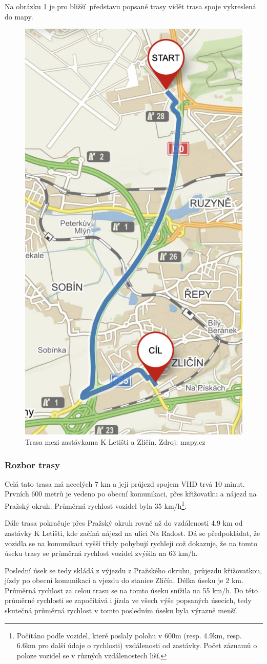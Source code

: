 \bigbreak

Na obrázku \ref{fig:k_letisti_to_zlicin_map} je pro bližší představu popsané trasy vidět trasa spoje vykreslená do mapy.

\begin{figure}
	\centering
  \includegraphics[width=0.3\linewidth]{../img/k_letisti_to_zlicin_map.png}
  \caption{Trasa mezi zastávkama K Letišti a Zličín. Zdroj: mapy.cz}
  \label{fig:k_letisti_to_zlicin_map}
\end{figure}

\subsubsection{Rozbor trasy}

Celá tato trasa má necelých 7 km a její průjezd spojem VHD trvá 10 minut. Prvních 600 metrů je vedeno po obecní komunikaci, přes křižovatku a nájezd na Pražský okruh. Průměrná rychlost vozidel byla 35 km/h\footnote{Počítáno podle vozidel, které poslaly polohu v 600m (resp. 4.9km, resp. 6.6km pro další údaje o rychlosti) vzdálenosti od zastávky. Počet záznamů o poloze vozidel se v různých vzdálenostech liší.}.

\bigbreak

Dále trasa pokračuje přes Pražský okruh rovně až do vzdálenosti 4.9 km od zastávky K Letišti, kde začíná nájezd na ulici Na Radost. Dá se předpokládat, že vozidla se na komunikaci vyšší třídy pohybují rychleji což dokazuje, že na tomto úseku trasy se průměrná rychlost vozidel zvýšila na 63 km/h.

\bigbreak

Poslední úsek se tedy skládá z výjezdu z Pražského okruhu, průjezdu křižovatkou, jízdy po obecní komunikaci a vjezdu do stanice Zličín. Délka úseku je 2 km. Průměrná rychlost za celou trasu se na tomto úseku snížila na 55 km/h. Do této průměrné rychlosti se započítává i jízda ve všech výše popsaných úsecích, tedy skutečná průměrná rychlost v tomto posledním úseku byla výrazně menší.


